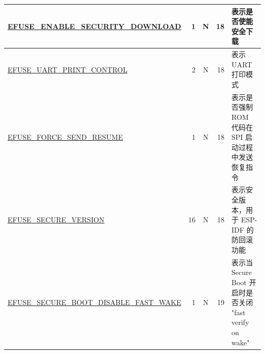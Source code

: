 \begin{longtable}[l]{ |m{8.2cm}|r|c|r|m{9.3cm}| }
    \hline 
    \hyperref[fielddesc:EFUSEENABLESECURITYDOWNLOAD]{EFUSE\_ENABLE\_SECURITY\_DOWNLOAD} & 1 & N & 18 & 表示是否使能安全下载 
    \\
    \hline
    \hyperref[fielddesc:EFUSEUARTPRINTCONTROL]{EFUSE\_UART\_PRINT\_CONTROL} & 2 & N & 18 & 表示 UART 打印模式\\
    \hline
    \hyperref[fielddesc:EFUSEFORCESENDRESUME]{EFUSE\_FORCE\_SEND\_RESUME} & 1 & N & 18 & 表示是否强制 ROM 代码在 SPI 启动过程中发送恢复指令 \\  
    \hline
    \hyperref[fielddesc:EFUSESECUREVERSION]{EFUSE\_SECURE\_VERSION} & 16 & N & 18 & 表示安全版本，用于 ESP-IDF 的防回滚功能\\\hline
    \hyperref[fielddesc:EFUSESECUREBOOTDISABLEFASTWAKE]{EFUSE\_SECURE\_BOOT\_DISABLE\_FAST\_WAKE} & 1 & N & 19 & 表示当 Secure Boot 开启时是否关闭 "fast verify on wake"\\\hline    
\end{longtable}
